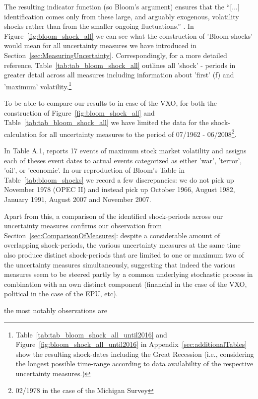 \documentclass[a4paper,11pt,listof=nochaptergap,oneside,pointednumbers,bibtotoc,bigheadings,liststotoc]{scrbook}
\begin{document}
The resulting indicator function (so Bloom's argument) ensures that the ``[...] identification comes only from these large, and arguably exogenous, volatility shocks rather than from the smaller ongoing fluctuations.'' \citep[p. 630]{bloom:09}. 
In Figure~\ref{fig:bloom_shock_all} we can see what the construction of 'Bloom-shocks' would mean for all uncertainty measures we have introduced in Section~\ref{sec:MeasuringUncertainty}. Correspondingly, for a more detailed reference, Table~\ref{tab:tab_bloom_shock_all} outlines all 'shock' - periods in greater detail across all measures including information about 'first' (f) and 'maximum' volatility.\footnote{Table~\ref{tab:tab_bloom_shock_all_until2016} and Figure~\ref{fig:bloom_shock_all_until2016} in Appendix~\ref{sec:additionalTables} show the resulting shock-dates including the Great Recession (i.e., considering the longest possible time-range according to data availability of the respective uncertainty measures.)} 

To be able to compare our results to \citet{bloom:09} in case of the VXO, for both the construction of Figure~\ref{fig:bloom_shock_all} and Table~\ref{tab:tab_bloom_shock_all} we have limited the data for the shock-calculation for all uncertainty measures to the period of 07/1962 - 06/2008\footnote{02/1978 in the case of the Michigan Survey}. 


In Table A.1, \citet[p. 676]{bloom:09} reports 17 events of maximum stock market volatility and assigns each of theses event dates to actual events categorized as either 'war', 'terror', 'oil', or 'economic'. In our reproduction of Bloom's Table in Table~\ref{tab:bloom_shocks} we record a few discrepancies: we do not pick up November 1978 (OPEC II) and instead pick up October 1966, August 1982, January 1991, August 2007 and November 2007. 

Apart from this, a comparison of the identified shock-periods across our uncertainty measures confirms our observation from Section~\ref{sec:ComparisonOfMeasures}: despite a considerable amount of overlapping shock-periods, the various uncertainty measures at the same time also produce distinct shock-periods that are limited to one or maximum two of the uncertainty measures simultaneously, suggesting that indeed the various measures seem to be steered partly by a common underlying stochastic process in combination with an own distinct component (financial in the case of the VXO, political in the case of the EPU, etc).

the most notably observations are 
\end{document}
